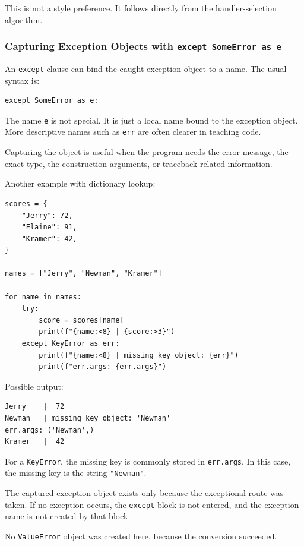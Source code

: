 This is not a style preference. It follows directly from the handler-selection algorithm.

\subsubsection{Capturing Exception Objects with \texttt{except SomeError as e}}

An \texttt{except} clause can bind the caught exception object to a name. The usual syntax is:

\begin{verbatim}
except SomeError as e:
\end{verbatim}

The name \texttt{e} is not special. It is just a local name bound to the exception object. More descriptive names such as \texttt{err} are often clearer in teaching code.

Capturing the object is useful when the program needs the error message, the exact type, the construction arguments, or traceback-related information.

Another example with dictionary lookup:

\begin{verbatim}
scores = {
    "Jerry": 72,
    "Elaine": 91,
    "Kramer": 42,
}

names = ["Jerry", "Newman", "Kramer"]

for name in names:
    try:
        score = scores[name]
        print(f"{name:<8} | {score:>3}")
    except KeyError as err:
        print(f"{name:<8} | missing key object: {err}")
        print(f"err.args: {err.args}")
\end{verbatim}

Possible output:

\begin{verbatim}
Jerry    |  72
Newman   | missing key object: 'Newman'
err.args: ('Newman',)
Kramer   |  42
\end{verbatim}

For a \texttt{KeyError}, the missing key is commonly stored in \texttt{err.args}. In this case, the missing key is the string \texttt{"Newman"}.

The captured exception object exists only because the exceptional route was taken. If no exception occurs, the \texttt{except} block is not entered, and the exception name is not created by that block.

No \texttt{ValueError} object was created here, because the conversion succeeded.

